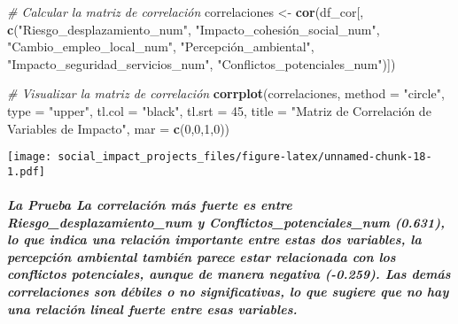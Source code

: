 \documentclass[
]{article}
\newenvironment{Shaded}{\begin{snugshade}}{\end{snugshade}}
\newcommand{\AttributeTok}[1]{\textcolor[rgb]{0.13,0.29,0.53}{#1}}
\newcommand{\CommentTok}[1]{\textcolor[rgb]{0.56,0.35,0.01}{\textit{#1}}}
\newcommand{\DecValTok}[1]{\textcolor[rgb]{0.00,0.00,0.81}{#1}}
\newcommand{\FunctionTok}[1]{\textcolor[rgb]{0.13,0.29,0.53}{\textbf{#1}}}
\newcommand{\NormalTok}[1]{#1}
\newcommand{\OtherTok}[1]{\textcolor[rgb]{0.56,0.35,0.01}{#1}}
\newcommand{\StringTok}[1]{\textcolor[rgb]{0.31,0.60,0.02}{#1}}
\begin{document}
\begin{Shaded}
\begin{Highlighting}[]
\CommentTok{\# Calcular la matriz de correlación}
\NormalTok{correlaciones }\OtherTok{\textless{}{-}} \FunctionTok{cor}\NormalTok{(df\_cor[, }\FunctionTok{c}\NormalTok{(}\StringTok{"Riesgo\_desplazamiento\_num"}\NormalTok{, }\StringTok{"Impacto\_cohesión\_social\_num"}\NormalTok{, }
                                \StringTok{"Cambio\_empleo\_local\_num"}\NormalTok{, }\StringTok{"Percepción\_ambiental"}\NormalTok{, }
                                \StringTok{"Impacto\_seguridad\_servicios\_num"}\NormalTok{, }\StringTok{"Conflictos\_potenciales\_num"}\NormalTok{)])}

\CommentTok{\# Visualizar la matriz de correlación}
\FunctionTok{corrplot}\NormalTok{(correlaciones, }\AttributeTok{method =} \StringTok{"circle"}\NormalTok{, }\AttributeTok{type =} \StringTok{"upper"}\NormalTok{, }\AttributeTok{tl.col =} \StringTok{"black"}\NormalTok{, }\AttributeTok{tl.srt =} \DecValTok{45}\NormalTok{,}
         \AttributeTok{title =} \StringTok{"Matriz de Correlación de Variables de Impacto"}\NormalTok{, }\AttributeTok{mar =} \FunctionTok{c}\NormalTok{(}\DecValTok{0}\NormalTok{,}\DecValTok{0}\NormalTok{,}\DecValTok{1}\NormalTok{,}\DecValTok{0}\NormalTok{))}
\end{Highlighting}
\end{Shaded}

\texttt{[image: social\_impact\_projects\_files/figure-latex/unnamed-chunk-18-1.pdf]}

\subparagraph{\texorpdfstring{\emph{La Prueba La correlación más fuerte
es entre Riesgo\_desplazamiento\_num y Conflictos\_potenciales\_num
(0.631), lo que indica una relación importante entre estas dos
variables, la percepción ambiental también parece estar relacionada con
los conflictos potenciales, aunque de manera negativa (-0.259). Las
demás correlaciones son débiles o no significativas, lo que sugiere que
no hay una relación lineal fuerte entre esas
variables.}}{La Prueba La correlación más fuerte es entre Riesgo\_desplazamiento\_num y Conflictos\_potenciales\_num (0.631), lo que indica una relación importante entre estas dos variables, la percepción ambiental también parece estar relacionada con los conflictos potenciales, aunque de manera negativa (-0.259). Las demás correlaciones son débiles o no significativas, lo que sugiere que no hay una relación lineal fuerte entre esas variables.}}\label{la-prueba-la-correlaciuxf3n-muxe1s-fuerte-es-entre-riesgo_desplazamiento_num-y-conflictos_potenciales_num-0.631-lo-que-indica-una-relaciuxf3n-importante-entre-estas-dos-variables-la-percepciuxf3n-ambiental-tambiuxe9n-parece-estar-relacionada-con-los-conflictos-potenciales-aunque-de-manera-negativa--0.259.-las-demuxe1s-correlaciones-son-duxe9biles-o-no-significativas-lo-que-sugiere-que-no-hay-una-relaciuxf3n-lineal-fuerte-entre-esas-variables.}
\end{document}
